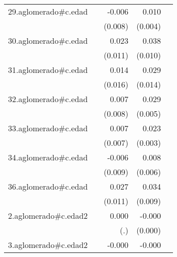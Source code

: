 {\begin{longtable}{l*{4}{D{.}{.}{-1}}}
\addlinespace
29.aglomerado#c.edad&                     &      -0.006         &       0.010\sym{*}  &                     \\
            &                     &     (0.008)         &     (0.004)         &                     \\
\addlinespace
30.aglomerado#c.edad&                     &       0.023\sym{*}  &       0.038\sym{***}&                     \\
            &                     &     (0.011)         &     (0.010)         &                     \\
\addlinespace
31.aglomerado#c.edad&                     &       0.014         &       0.029\sym{*}  &                     \\
            &                     &     (0.016)         &     (0.014)         &                     \\
\addlinespace
32.aglomerado#c.edad&                     &       0.007         &       0.029\sym{***}&                     \\
            &                     &     (0.008)         &     (0.005)         &                     \\
\addlinespace
33.aglomerado#c.edad&                     &       0.007         &       0.023\sym{***}&                     \\
            &                     &     (0.007)         &     (0.003)         &                     \\
\addlinespace
34.aglomerado#c.edad&                     &      -0.006         &       0.008         &                     \\
            &                     &     (0.009)         &     (0.006)         &                     \\
\addlinespace
36.aglomerado#c.edad&                     &       0.027\sym{*}  &       0.034\sym{***}&                     \\
            &                     &     (0.011)         &     (0.009)         &                     \\
\addlinespace
2.aglomerado#c.edad2&                     &       0.000         &      -0.000         &                     \\
            &                     &         (.)         &     (0.000)         &                     \\
\addlinespace
3.aglomerado#c.edad2&                     &      -0.000         &      -0.000\sym{**} &                     \\

\end{longtable}}
